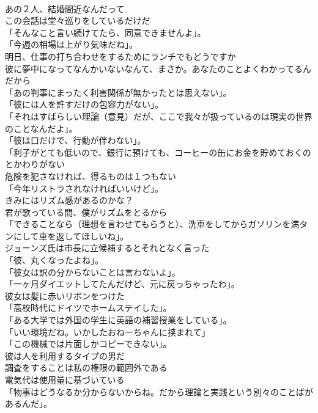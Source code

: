 \documentclass[8pt]{extreport}
\begin{document}
\begin{CJK}{UTF8}{min}
\\	あの２人、結婚間近なんだって	
\\	この会話は堂々巡りをしているだけだ	
\\	「そんなこと言い続けてたら、同意できませんよ」。	
\\	「今週の相場は上がり気味だね」。	
\\	明日、仕事の打ち合わせをするためにランチでもどうですか	
\\	彼に夢中になってなんかいないなんて、まさか。あなたのことよくわかってるんだから	
\\	「あの判事にまったく利害関係が無かったとは思えない」。	
\\	「彼には人を許すだけの包容力がない」。	
\\	「それはすばらしい理論（意見）だが、ここで我々が扱っているのは現実の世界のことなんだよ」。	
\\	「彼は口だけで、行動が伴わない」。	
\\	「利子がとても低いので、銀行に預けても、コーヒーの缶にお金を貯めておくのとかわりがない	
\\	危険を犯さなければ、得るものは１つもない	
\\	「今年リストラされなければいいけど」。	
\\	きみにはリズム感があるのかな？	
\\	君が歌っている間、僕がリズムをとるから	
\\	「できることなら（理想を言わせてもらうと）、洗車をしてからガソリンを満タンにして車を返してほしいね」。	
\\	ジョーンズ氏は市長に立候補するとそれとなく言った	
\\	「彼、丸くなったよね」。	
\\	「彼女は訳の分からないことは言わないよ」。	
\\	「一ヶ月ダイエットしてたんだけど、元に戻っちゃったわ」。	
\\	彼女は髪に赤いリボンをつけた	
\\	「高校時代にドイツでホームステイした」。	
\\	「ある大学では外国の学生に英語の補習授業をしている」。	
\\	「いい環境だね。いかしたおねーちゃんに挟まれて」	
\\	「この機械では片面しかコピーできない」。	
\\	彼は人を利用するタイプの男だ	
\\	調査をすることは私の権限の範囲外である	
\\	電気代は使用量に基づいている	
\\	「物事はどうなるか分からないからね。だから理論と実践という別々のことばがあるんだ」。	

\end{CJK}
\end{document}
